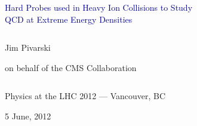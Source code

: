 \documentclass[compress]{beamer}
\begin{document}
\begin{frame}
\vfill
\begin{center}
\textcolor{darkblue}{\Large Hard Probes used in Heavy Ion Collisions to Study \\ \vspace{0.2 cm} QCD at Extreme Energy Densities}

\vfill
\begin{columns}
\begin{center}
\Large
Jim Pivarski

\vspace{0.3 cm}
\large
on behalf of the CMS Collaboration
\end{center}
\end{columns}


\vfill
\small
Physics at the LHC 2012 --- Vancouver, BC

\vspace{0.1 cm}
\normalsize
 5 June, 2012

\end{center}
\end{frame}


\small
\end{document}
